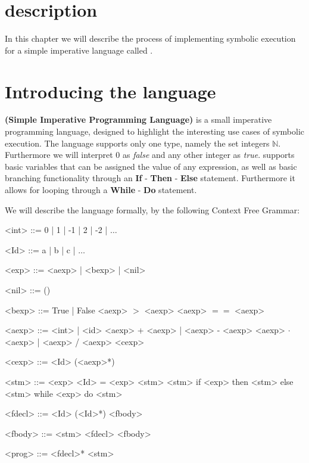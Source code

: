 \section{description}

In this chapter we will describe the process of implementing symbolic execution for a simple imperative language called \simpl.

\section{Introducing the \simpl language}

\simpl\textbf{(Simple Imperative Programming Language)} is a small imperative programming language, designed to highlight the interesting use cases of symbolic execution. The language supports only one type, namely the set integers $\mathbb{N}$.
Furthermore we will interpret 0 as \emph{false} and any other integer as \emph{true}.
 \simpl supports basic
 variables that can be assigned the value of any expression, as well as basic branching functionality through an \textbf{If} - \textbf{Then} - \textbf{Else} statement. Furthermore it allows for looping through a \textbf{While} - \textbf{Do} statement.

We will describe the language formally, by the following Context Free Grammar:

\newpage
\begin{grammar}
	<int> ::= 0 | 1 | -1 | 2 | -2 | $\ldots$
	
	<Id> ::= a | b | c | $\ldots$ 
	
	<exp> ::= <aexp> | <bexp> | <nil>
	
	<nil> ::= ()
	
	<bexp> ::= True | False
	\alt <aexp> $>$ <aexp>
	\alt <aexp> $==$ <aexp>
	
	<aexp> ::= <int> | <id>
	\alt <aexp> + <aexp> | <aexp> - <aexp> 
	\alt <aexp> $\cdot$ <aexp> | <aexp> / <aexp>
	\alt <cexp>
	
	<cexp> ::= <Id> (<aexp>*) 
	
	<stm> ::= <exp>
	\alt <Id> = <exp>
	\alt <stm> <stm>
	\alt if <exp> then <stm> else <stm>
	\alt while <exp> do <stm>
	
	<fdecl> ::= <Id> (<Id>*) {<fbody>}
	
	<fbody> ::= <stm>
	\alt <fdecl> <fbody>
	
	<prog> ::= <fdecl>* <stm>
	
\end{grammar}

